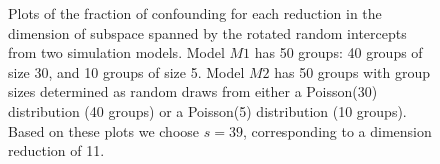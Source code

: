 \documentclass[12pt]{article} %
\newcommand{\al}[1]{{\color{red} #1}}
\begin{document}
{%
%
\begin{figure}[htb]
	\centering
	\caption{\label{fig:elbow} Plots of the fraction of confounding for each reduction in the dimension of subspace spanned by the rotated random intercepts from two simulation models. Model $M1$ has 50 groups: 40 groups of size 30, and 10 groups of size 5. Model $M2$ has 50 groups with group sizes determined as random draws from either a Poisson(30) distribution (40 groups) or a Poisson(5) distribution (10 groups). Based on these plots we  choose $s = 39$, corresponding to a dimension reduction of 11.}
\end{figure}


}
\end{document}
